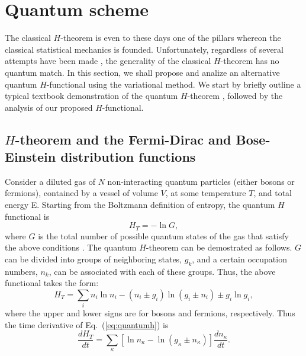 \section{Quantum scheme}\label{sec:quantum}

The classical $H$-theorem is even to these days one of the pillars whereon the classical statistical
mechanics is founded. Unfortunately, regardless of several attempts have been made
, 
the generality of the classical $H$-theorem has no quantum match. In this section, we shall
propose and analize an alternative quantum $H$-functional using the variational method.
We start by briefly outline a typical textbook demonstration of the quantum $H$-theorem
\cite{bib:tolman}, followed by the analysis of our proposed $H$-functional.

\subsection{$H$-theorem and the Fermi-Dirac and Bose-Einstein distribution functions}

Consider a diluted gas of $N$ non-interacting quantum particles (either bosons or fermions),
contained by a vessel of volume
$V$, at some temperature $T$, and total energy E. Starting from the Boltzmann definition
of entropy, the quantum $H$ functional is
%
\begin{equation}
   H_T=-\ln G,
\end{equation}
%
where $G$ is the total number of possible quantum states of the gas that satisfy the
above conditions \cite{bib:tolman}.
The quantum $H$-theorem can be demostrated as follows.  $G$ can be divided into groups of neighboring states,
$g_k$, and a certain occupation numbers, $n_k$, can be associated with each of these
groups. Thus, the above functional takes the form:
%
\begin{equation}\label{eq:quantumh}
    H_T=\sum_i n_i \ln n_i -(n_i\pm g_i)\ln (g_i \pm n_i)\pm g_i\ln g_i, 
\end{equation}
%
where the upper and lower signs are for bosons and fermions, respectively.
Thus the time derivative of Eq.~(\ref{eq:quantumh}) is
%
\begin{equation}\label{eq:quantumdHdt}
\frac{dH_T}{dt}=\sum_{\kappa}\left[\ln n_{\kappa}-\ln\left(g_{\kappa}\pm n_{\kappa}\right)\right]
\frac{dn_{\kappa}}{dt}.
\end{equation}
%

